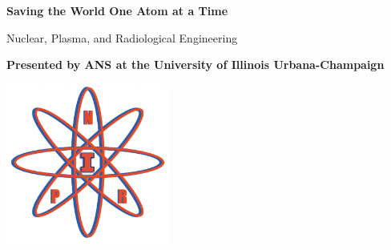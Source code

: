 \documentclass[12pt, letterpaper]{article}
\begin{document}
\begin{titlepage}
   \begin{center}
       \vspace*{1cm}
 
       \textbf{Saving the World One Atom at a Time}
 
       \vspace{0.5cm}
       Nuclear, Plasma, and Radiological Engineering
 
       \vspace{1.5cm}
 
       \textbf{Presented by ANS at the University of Illinois Urbana-Champaign}
 
       \vfill
       \vspace{0.8cm}
 
       \includegraphics[width=0.4\textwidth]{ans_sc_logo2.png}
   \end{center}
\end{titlepage}








\end{document}
